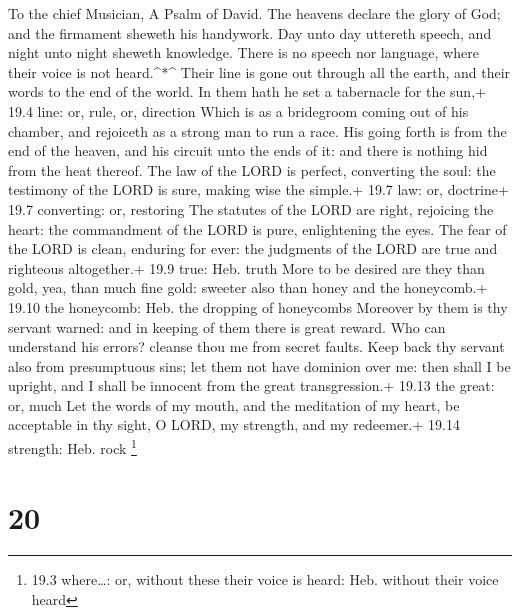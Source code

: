 To the chief Musician, A Psalm of David.  The heavens
declare the glory of God; and the firmament sheweth his handywork.
 Day unto day uttereth speech, and night unto night sheweth
knowledge.  There is no speech nor language, where their
voice is not heard.\^{}*\^{}  Their line is gone out through
all the earth, and their words to the end of the world. In them hath he
set a tabernacle for the sun,+ 19.4 line: or, rule, or, direction
 Which is as a bridegroom coming out of his chamber, and
rejoiceth as a strong man to run a race.  His going forth is
from the end of the heaven, and his circuit unto the ends of it: and
there is nothing hid from the heat thereof.  The law of the
LORD is perfect, converting the soul: the testimony of the LORD is sure,
making wise the simple.+ 19.7 law: or, doctrine+ 19.7 converting: or,
restoring  The statutes of the LORD are right, rejoicing the
heart: the commandment of the LORD is pure, enlightening the eyes.
 The fear of the LORD is clean, enduring for ever: the
judgments of the LORD are true and righteous altogether.+ 19.9 true:
Heb. truth  More to be desired are they than gold, yea,
than much fine gold: sweeter also than honey and the honeycomb.+ 19.10
the honeycomb: Heb. the dropping of honeycombs  Moreover by
them is thy servant warned: and in keeping of them there is great
reward.  Who can understand his errors? cleanse thou me
from secret faults.  Keep back thy servant also from
presumptuous sins; let them not have dominion over me: then shall I be
upright, and I shall be innocent from the great transgression.+ 19.13
the great: or, much  Let the words of my mouth, and the
meditation of my heart, be acceptable in thy sight, O LORD, my strength,
and my redeemer.+ 19.14 strength: Heb. rock \footnote{19.3 where\ldots:
  or, without these their voice is heard: Heb. without their voice heard}

\hypertarget{section-19}{%
\section{20}\label{section-19}}

